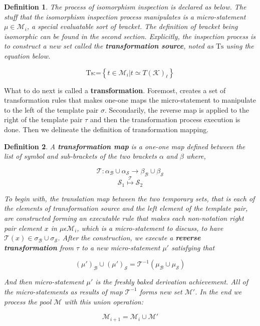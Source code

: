\documentclass{article}
\newtheorem{definition}{Definition}	%
\numberwithin{theorem}{section}	%
\numberwithin{axiom}{section}	%
\numberwithin{definition}{section}	%
\begin{document}
\begin{definition}
	The process of isomorphism inspection is declared as below. The stuff that the isomorphism inspection process manipulates is a micro-statement \(\mu \in \mathcal{M}_i\), a special evaluatable sort of bracket. The definition of bracket being isomorphic can be found in the second section. Explicitly, the inspection process is to construct a new set called the \textbf{ transformation source}, noted as \(\text{Ts}\) using the equation below.
	
	\[\text{Ts}\text{:=}\left\{t\in \mathcal{M}_i|t\simeq T(\mathcal{K})_{\ell }\right\}\]
\end{definition}

What to do next is called a \textbf{ transformation}. Foremost, creates a set of transformation rules that makes one-one maps the micro-statement to manipulate to the left of the template pair \(\sigma\). Secondarily, the reverse map is applied to the right of the template pair \(\tau\) and then the transformation process execution is done. Then we delineate the definition of { }transformation mapping.

\begin{definition}
	A \textbf{ transformation map} is a one-one map defined between the list of symbol and sub-brackets of the two brackets \(\alpha\) and \(\beta\) where,
	
	\[\mathcal{T}:\alpha _{\mathcal{B}}\cup \alpha _{\mathcal{S}}\to \beta _{\mathcal{B}}\cup \beta _{\mathcal{S}}\]
	\[\mathcal{S}_1\overset{\mathcal{T}}{\mapsto }\mathcal{S}_2\]
	
	To begin with, the translation map between the two temporary sets, that is each of the elements of transformation source and the left element of the template pair, are constructed forming an executable rule that makes each non-notation right pair element \(x\) in \(\mu \epsilon \mathcal{M}_i\), which is a micro-statement to discuss, to have \(\mathcal{T}(x)\in \sigma _{\mathcal{B}}\cup \sigma _{\mathcal{S}}\). After the construction, we execute a \textbf{ reverse transformation } from \(\tau\) to a new micro-statement \(\mu '\) satisfying that
	
	\[(\mu ')_{\mathcal{B}}\cup (\mu ')_{\mathcal{S}} =\mathcal{T}^{-1}\left(\mu _{\mathcal{B}}\cup \mu _{\mathcal{S}}\right)\]
	
	And then micro-statement \(\mu '\) is the freshly baked derivation achievement. All of the micro-statements as results of map \(\mathcal{T}^{-1}\) forms new set \(\mathcal{M}'\). In the end we process the pool \(\mathcal{M}\) with this union operation:
	
	\[\mathcal{M}_{i+1}=\mathcal{M}_i\cup \mathcal{M}'\]
\end{definition}
\end{document}

